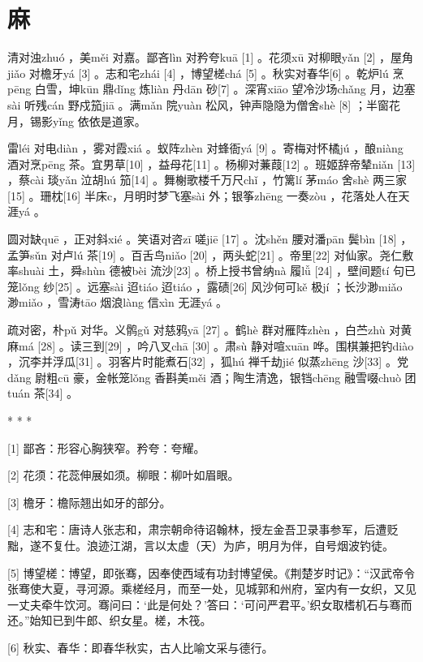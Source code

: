 \documentclass[12pt,UTF8]{ctexbook}
\begin{document}
\chapter{麻}


清对浊zhuó ，美měi 对嘉。鄙吝lìn 对矜夸kuā [1] 。花须xū 对柳眼yǎn [2] ，屋角jiǎo 对檐牙yá [3] 。志和宅zhái [4] ，博望槎chá [5] 。秋实对春华[6] 。乾炉lú 烹pēng 白雪，坤kūn 鼎dǐng 炼liàn 丹dān 砂[7] 。深宵xiāo 望冷沙场chǎng 月，边塞sài 听残cán 野戍笳jiā 。满mǎn 院yuàn 松风，钟声隐隐为僧舍shè [8] ；半窗花月，锡影yǐng 依依是道家。

雷léi 对电diàn ，雾对霞xiá 。蚁阵zhèn 对蜂衙yá [9] 。寄梅对怀橘jú ，酿niàng 酒对烹pēng 茶。宜男草[10] ，益母花[11] 。杨柳对蒹葭[12] 。班姬辞帝辇niǎn [13] ，蔡cài 琰yǎn 泣胡hú 笳[14] 。舞榭歌楼千万尺chǐ ，竹篱lí 茅máo 舍shè 两三家[15] 。珊枕[16] 半床c，月明时梦飞塞sài 外；银筝zhēng 一奏zòu ，花落处人在天涯yá 。

圆对缺quē ，正对斜xié 。笑语对咨zī 嗟jiē [17] 。沈shěn 腰对潘pān 鬓bìn [18] ，孟笋sǔn 对卢lú 茶[19] 。百舌鸟niǎo [20] ，两头蛇[21] 。帝里[22] 对仙家。尧仁敷率shuài 土，舜shùn 德被bèi 流沙[23] 。桥上授书曾纳nà 履lǚ [24] ，壁间题tí 句已笼lǒng 纱[25] 。远塞sài 迢tiáo 迢tiáo ，露碛[26] 风沙何可kě 极jí ；长沙渺miǎo 渺miǎo ，雪涛tāo 烟浪làng 信xìn 无涯yá 。

疏对密，朴pǔ 对华。义鹘gǔ 对慈鸦yā [27] 。鹤hè 群对雁阵zhèn ，白苎zhù 对黄麻má [28] 。读三到[29] ，吟八叉chā [30] 。肃sù 静对喧xuān 哗。围棋兼把钓diào ，沉李并浮瓜[31] 。羽客片时能煮石[32] ，狐hú 禅千劫jié 似蒸zhēng 沙[33] 。党dǎng 尉粗cū 豪，金帐笼lǒng 香斟美měi 酒；陶生清逸，银铛chēng 融雪啜chuò 团tuán 茶[34] 。



* * *



[1] 鄙吝：形容心胸狭窄。矜夸：夸耀。

[2] 花须：花蕊伸展如须。柳眼：柳叶如眉眼。

[3] 檐牙：檐际翘出如牙的部分。

[4] 志和宅：唐诗人张志和，肃宗朝命待诏翰林，授左金吾卫录事参军，后遭贬黜，遂不复仕。浪迹江湖，言以太虚（天）为庐，明月为伴，自号烟波钓徒。

[5] 博望槎：博望，即张骞，因奉使西域有功封博望侯。《荆楚岁时记》：“汉武帝令张骞使大夏，寻河源。乘槎经月，而至一处，见城郭和州府，室内有一女织，又见一丈夫牵牛饮河。骞问曰：‘此是何处？’答曰：‘可问严君平。’织女取榰机石与骞而还。”始知已到牛郎、织女星。槎，木筏。

[6] 秋实、春华：即春华秋实，古人比喻文采与德行。
\end{document}

